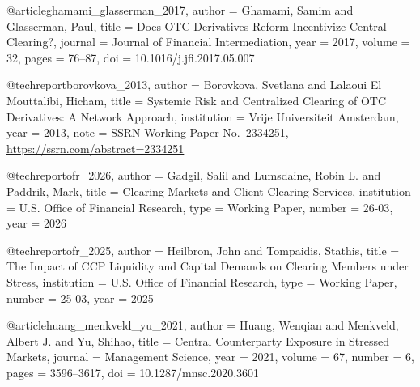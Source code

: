 @article{ghamami_glasserman_2017,
  author  = {Ghamami, Samim and Glasserman, Paul},
  title   = {Does {OTC} Derivatives Reform Incentivize Central Clearing?},
  journal = {Journal of Financial Intermediation},
  year    = {2017}, volume = {32}, pages = {76--87},
  doi     = {10.1016/j.jfi.2017.05.007}
}


@techreport{borovkova_2013,
  author      = {Borovkova, Svetlana and {Lalaoui El Mouttalibi}, Hicham},
  title       = {Systemic Risk and Centralized Clearing of {OTC} Derivatives: A Network Approach},
  institution = {Vrije Universiteit Amsterdam},
  year        = {2013},
  note        = {SSRN Working Paper No.~2334251, \url{https://ssrn.com/abstract=2334251}}
}



@techreport{ofr_2026,
  author      = {Gadgil, Salil and Lumsdaine, Robin L. and Paddrik, Mark},
  title       = {Clearing Markets and Client Clearing Services},
  institution = {U.S. Office of Financial Research}, type = {Working Paper},
  number      = {26-03}, year = {2026}
}


@techreport{ofr_2025,
  author      = {Heilbron, John and Tompaidis, Stathis},
  title       = {The Impact of {CCP} Liquidity and Capital Demands on Clearing Members under Stress},
  institution = {U.S. Office of Financial Research}, type = {Working Paper},
  number      = {25-03}, year = {2025}
}


@article{huang_menkveld_yu_2021,
  author  = {Huang, Wenqian and Menkveld, Albert J. and Yu, Shihao},
  title   = {Central Counterparty Exposure in Stressed Markets},
  journal = {Management Science},
  year    = {2021}, volume = {67}, number = {6}, pages = {3596--3617},
  doi     = {10.1287/mnsc.2020.3601}
}

